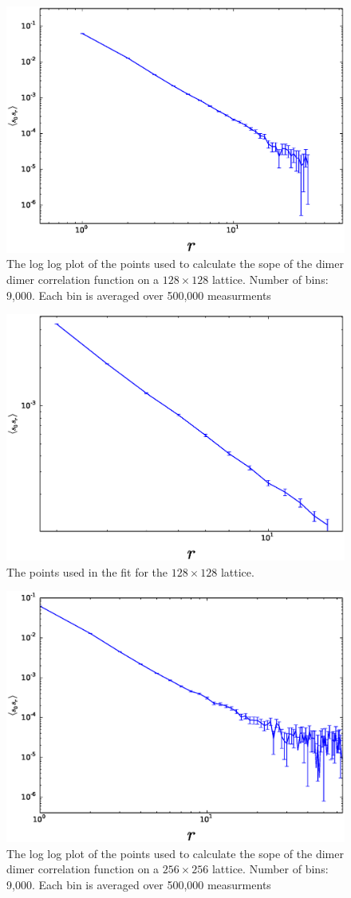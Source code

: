 \documentclass[aps,floatfix,11pt]{revtex4-1}
\begin{document}
\begin{figure}[h]
    \centering
    \includegraphics[width=8.5 cm]{dimer_dimer_cor_log_128x128}
    \caption{The log log plot of the points used to calculate the sope of the dimer dimer
        correlation function on a $128\times 128$ lattice. Number of bins: 9,000. Each bin is
    averaged over 500,000 measurments\label{fig:dimer_dimer_cor_log_128x128}}
\end{figure}

\begin{figure}[h]
    \centering
    \includegraphics[width=8.5 cm]{fit_dm_dm_horz_ln_pnts_128x128}
    \caption{The points used in the fit for the $128\times128$ lattice.\label{fig:fit_dm_dm_128x128}}
\end{figure}

\begin{figure}[h]
    \centering
    \includegraphics[width=8.5 cm]{dimer_dimer_cor_log_256x256}
    \caption{The log log plot of the points used to calculate the sope of the dimer dimer
        correlation function on a $256\times 256$ lattice. Number of bins: 9,000. Each bin is
    averaged over 500,000 measurments\label{dimer_dimer_cor_log_256x256}}
\end{figure}
\end{document}
